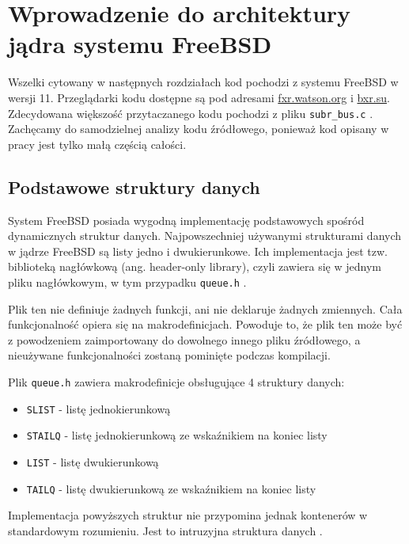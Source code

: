\documentclass[shortabstract,inz]{iithesis}
\begin{document}

\chapter{Wprowadzenie do architektury jądra systemu FreeBSD}

Wszelki cytowany w następnych rozdziałach kod pochodzi z systemu FreeBSD w wersji 11.
Przeglądarki kodu dostępne są pod adresami \url{fxr.watson.org} i \url{bxr.su}.
Zdecydowana większość przytaczanego kodu pochodzi z pliku \texttt{subr\_bus.c} \cite{freebsd:code_subr_bus}.
Zachęcamy do samodzielnej analizy kodu źródłowego, ponieważ kod opisany w pracy jest tylko małą
częścią całości.

\section{Podstawowe struktury danych} %

System FreeBSD posiada wygodną implementację podstawowych spośród dynamicznych struktur danych.
Najpowszechniej używanymi strukturami danych w jądrze FreeBSD są listy jedno i 
dwukierunkowe. Ich implementacja jest tzw. biblioteką nagłówkową (ang. header-only library), 
czyli zawiera się w jednym pliku nagłówkowym, w tym przypadku \texttt{queue.h} \cite{queue_h}.

Plik ten nie definiuje żadnych funkcji, ani nie deklaruje
żadnych zmiennych. Cała funkcjonalność opiera się na makrodefinicjach.
Powoduje to, że plik ten może być z powodzeniem zaimportowany do dowolnego innego
pliku źródłowego, a nieużywane funkcjonalności zostaną pominięte podczas kompilacji.

Plik \texttt{queue.h} zawiera makrodefinicje obsługujące 4 struktury danych:
\begin{itemize}
  \item \texttt{SLIST} - listę jednokierunkową
  \item \texttt{STAILQ} - listę jednokierunkową ze wskaźnikiem na koniec listy
  \item \texttt{LIST} - listę dwukierunkową
  \item \texttt{TAILQ} - listę dwukierunkową ze wskaźnikiem na koniec listy
\end{itemize}

Implementacja powyższych struktur nie przypomina jednak kontenerów w standardowym rozumieniu.
Jest to intruzyjna struktura danych \cite{paper:intrusive}.
\end{document}
